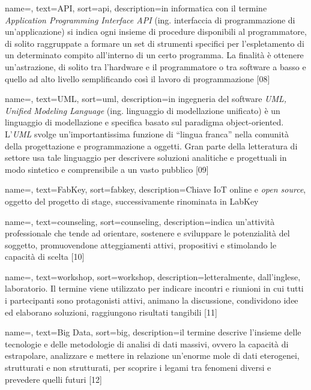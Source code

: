 \renewcommand{\glossaryname}{Glossario}

{
    name=,
    text=API,
    sort=api,
    description={in informatica con il termine \emph{Application Programming Interface API} (ing. interfaccia di programmazione di un'applicazione) si indica ogni insieme di procedure disponibili al programmatore, di solito raggruppate a formare un set di strumenti specifici per l'espletamento di un determinato compito all'interno di un certo programma. La finalità è ottenere un'astrazione, di solito tra l'hardware e il programmatore o tra software a basso e quello ad alto livello semplificando così il lavoro di programmazione [08]}
}

{
    name=,
    text=UML,
    sort=uml,
    description={in ingegneria del software \emph{UML, Unified Modeling Language} (ing. linguaggio di modellazione unificato) è un linguaggio di modellazione e specifica basato sul paradigma object-oriented. L'\emph{UML} svolge un'importantissima funzione di ``lingua franca'' nella comunità della progettazione e programmazione a oggetti. Gran parte della letteratura di settore usa tale linguaggio per descrivere soluzioni analitiche e progettuali in modo sintetico e comprensibile a un vasto pubblico [09]}
}

{
    name=,
    text=FabKey,
    sort=fabkey,
    description={Chiave IoT online e \textit{open source}, oggetto del progetto di stage, successivamente rinominata in LabKey}
}

{
	name=,
    text=counseling,
    sort=counseling,
    description={indica un'attività professionale che tende ad orientare, sostenere e sviluppare le potenzialità del soggetto, promuovendone atteggiamenti attivi, propositivi e stimolando le capacità di scelta [10]}
}

{
	name=,
    text=workshop,
    sort=workshop,
    description={letteralmente, dall'inglese, laboratorio. Il termine viene utilizzato per indicare incontri e riunioni in cui tutti i partecipanti sono protagonisti attivi, animano la discussione, condividono idee ed elaborano soluzioni, raggiungono risultati tangibili [11]}
}

{
	name=,
    text=Big Data,
    sort=big,
    description={il termine descrive l'insieme delle tecnologie e delle metodologie di analisi di dati massivi, ovvero la capacità di estrapolare, analizzare e mettere in relazione un'enorme mole di dati eterogenei, strutturati e non strutturati, per scoprire i legami tra fenomeni diversi e prevedere quelli futuri [12]}
}

